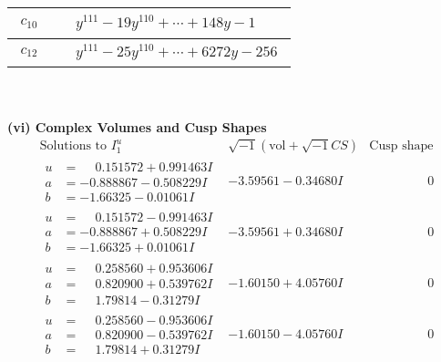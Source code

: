 \documentclass[1p]{elsarticle_modified}
\theoremstyle{definition}
\newcommand{\I}{\sqrt{-1}}
\begin{document}
\begin{tabular}{m{50pt}|m{274pt}}
\hline $$\begin{aligned}c_{10}\end{aligned}$$&$\begin{aligned}
&y^{111}-19 y^{110}+\cdots+148 y-1
\end{aligned}$\\
\hline $$\begin{aligned}c_{12}\end{aligned}$$&$\begin{aligned}
&y^{111}-25 y^{110}+\cdots+6272 y-256
\end{aligned}$\\
\hline
\end{tabular}\\~\\
\newpage\flushleft \textbf{(vi) Complex Volumes and Cusp Shapes}
$$\begin{array}{c|c|c}  
\text{Solutions to }I^u_{1}& \I (\text{vol} + \sqrt{-1}CS) & \text{Cusp shape}\\
 \hline 
\begin{aligned}
u &= \phantom{-}0.151572 + 0.991463 I \\
a &= -0.888867 - 0.508229 I \\
b &= -1.66325 - 0.01061 I\end{aligned}
 & -3.59561 - 0.34680 I & \phantom{-0.000000 } 0 \\ \hline\begin{aligned}
u &= \phantom{-}0.151572 - 0.991463 I \\
a &= -0.888867 + 0.508229 I \\
b &= -1.66325 + 0.01061 I\end{aligned}
 & -3.59561 + 0.34680 I & \phantom{-0.000000 } 0 \\ \hline\begin{aligned}
u &= \phantom{-}0.258560 + 0.953606 I \\
a &= \phantom{-}0.820900 + 0.539762 I \\
b &= \phantom{-}1.79814 - 0.31279 I\end{aligned}
 & -1.60150 + 4.05760 I & \phantom{-0.000000 } 0 \\ \hline\begin{aligned}
u &= \phantom{-}0.258560 - 0.953606 I \\
a &= \phantom{-}0.820900 - 0.539762 I \\
b &= \phantom{-}1.79814 + 0.31279 I\end{aligned}
 & -1.60150 - 4.05760 I & \phantom{-0.000000 } 0 \\ \hline\begin{aligned}

\end{aligned}
\end{array}$$
\end{document}
